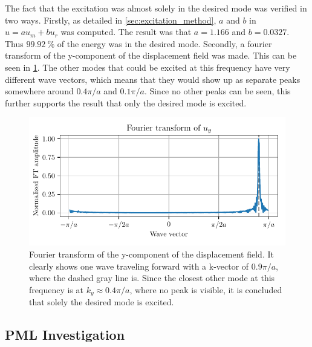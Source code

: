The fact that the excitation was almost solely in the desired mode was verified
in two ways.
Firstly, as detailed in \cref{sec:excitation_method}, $a$ and $b$ in $u = a u_m
+ b u_r$ was computed.
The result was that $a = 1.166$ and $b = 0.0327$.
Thus $99.92~\%$ of the energy was in the desired mode.
Secondly, a fourier transform of the y-component of the displacement field was
made.
This can be seen in \cref{fig:v_ft}.
The other modes that could be excited at this frequency have very different wave
vectors, which means that they would show up as separate peaks somewhere around
$0.4 \pi / a$ and $0.1 \pi / a$.
Since no other peaks can be seen, this further supports the result that only the
desired mode is excited.

\begin{figure}[htpb]
	\centering
	\includegraphics{chapters/results/ft_figure.pdf}
	\caption{%
		Fourier transform of the y-component of the displacement field.
		It clearly shows one wave traveling forward with a k-vector of
		$0.9 \pi / a$, where the dashed gray line is.
		Since the closest other mode at this frequency is at
		$k_y \approx 0.4 \pi / a$, where no peak is visible, it is concluded
		that solely the desired mode is excited.
	}%
	\label{fig:v_ft}
\end{figure}

\subsection{PML Investigation}

